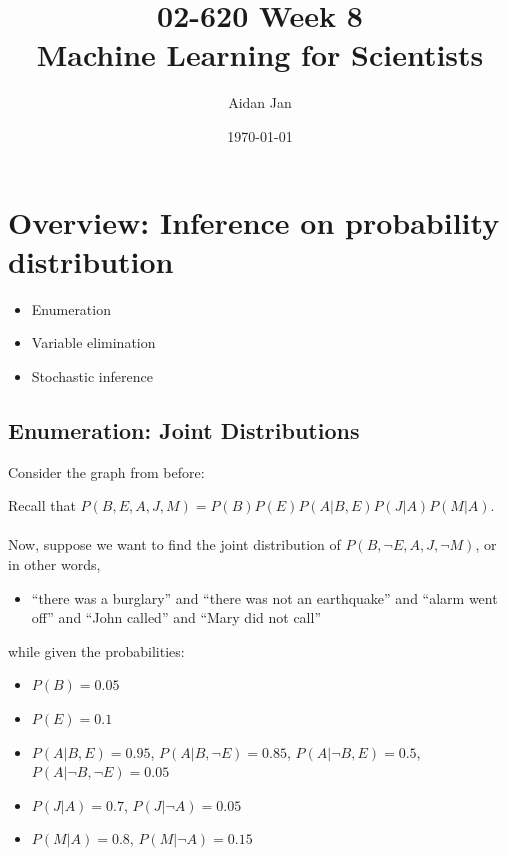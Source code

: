 \documentclass[10pt]{article}
\title{02-620 Week 8 \\ \large{Machine Learning for Scientists}}
\author{Aidan Jan}
\date{\today}
\begin{document}
\maketitle

\section*{Overview: Inference on probability distribution}
\begin{itemize}
	\item Enumeration
	\item Variable elimination
	\item Stochastic inference
\end{itemize}

\subsection*{Enumeration: Joint Distributions}
Consider the graph from before:
\begin{center}
\end{center}
Recall that $P(B, E, A, J, M) = P(B) P(E) P(A | B, E) P(J | A) P(M | A)$.\\\\
Now, suppose we want to find the joint distribution of $P(B, \neg E, A, J, \neg M)$, or in other words,
\begin{itemize}
	\item ``there was a burglary'' and ``there was not an earthquake'' and ``alarm went off'' and ``John called'' and ``Mary did not call''
\end{itemize}
while given the probabilities:
\begin{itemize}
	\item $P(B) = 0.05$
	\item $P(E) = 0.1$
    \item $P(A | B, E) = 0.95$, $P(A | B, \neg E) = 0.85$, $P(A | \neg B, E) = 0.5$, $P(A | \neg B, \neg E) = 0.05$
	\item $P(J | A) = 0.7$, $P(J | \neg A) = 0.05$
	\item $P(M | A) = 0.8$, $P(M | \neg A) = 0.15$
\end{itemize}
\end{document}
